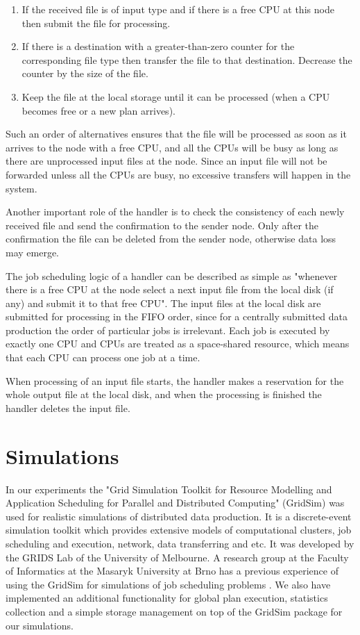 \documentclass{svjour3}                     %
\begin{document}
\begin{enumerate}
\item If the received file is of input type and if there is a free CPU at this node then submit the file for processing.
\item If there is a destination with a greater-than-zero counter for the corresponding file type then transfer the file to that destination. Decrease the counter by the size of the file.
\item Keep the file at the local storage until it can be processed (when a CPU becomes free  or a new plan arrives).
\end{enumerate}
Such an order of alternatives ensures that the file will be processed as soon as it arrives to the node with a free CPU, and all the CPUs will be busy as long as there are unprocessed input files at the node. Since an input file will not be forwarded unless all the CPUs are busy, no excessive transfers will happen in the system.

Another important role of the handler is to check the consistency of each newly received file and send the confirmation to the sender node. Only after the confirmation the file can be deleted from the sender node, otherwise data loss may emerge. 

The job scheduling logic of a handler can be described as simple as "whenever there is a free CPU at the node select a next input file from the local disk (if any) and submit it to that free CPU". The input files at the local disk are submitted for processing in the FIFO order, since for a centrally submitted data production the order of particular jobs is irrelevant. Each job is executed by exactly one CPU and CPUs are treated as a space-shared resource, which means that each CPU can process one job at a time.

When processing of an input file starts, the handler makes a reservation for the whole output file at the local disk, and when the processing is finished the handler deletes the input file.

\section{Simulations}
\label{simulations}
In our experiments the "Grid Simulation Toolkit for Resource Modelling and Application Scheduling for Parallel and Distributed Computing" (GridSim) \cite{GridSim} was used for realistic simulations of distributed data production. It is a discrete-event simulation toolkit which provides extensive models of computational clusters, job scheduling and execution, network, data transferring and etc. It was developed by the GRIDS Lab of the University of Melbourne. A research group at the Faculty of Informatics at the Masaryk University at Brno has a previous experience of using the GridSim for simulations of job scheduling problems \cite{alea2}.
We also have implemented an additional functionality for global plan execution, statistics collection and a simple storage management   on top of the GridSim package for our simulations.
\end{document}
